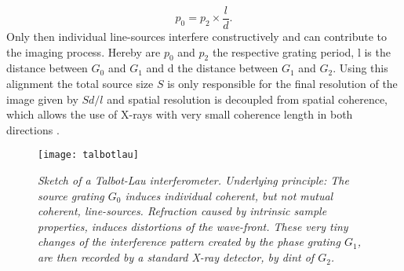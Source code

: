 \begin{equation}
p_{0} = p_{2}\times \frac{l}{d}.
\end{equation}
Only then individual line-sources interfere constructively and can contribute to the imaging process. 
Hereby are $p_{0}$ and $p_{2}$ the respective grating period, l is the distance between $G_{0}$ and $G_{1}$ and d the distance between $G_{1}$ and $G_{2}$. Using this alignment the total source size $S$ is only responsible for the final resolution of the image given by $ Sd/l$ and spatial resolution is decoupled from spatial coherence, which allows the use of X-rays with very small coherence length in both directions \citep{Pfeiffer2006}. 
\begin{figure}[h]
	\begin{center}
		\texttt{[image: talbotlau]}		
	\end{center}
	\caption[Sketch of a Talbot-Lau interferometer]{\textit{Sketch of a Talbot-Lau interferometer. Underlying principle: The source  grating $G_{0}$ induces individual coherent, but not mutual coherent, line-sources. Refraction caused by intrinsic sample properties, induces distortions of the wave-front. These very tiny changes of the interference pattern created by the phase grating $G_{1}$, are then recorded by a standard X-ray detector, by dint of $G_{2}$.}}
	\label{talbotlau}   		
\end{figure}
